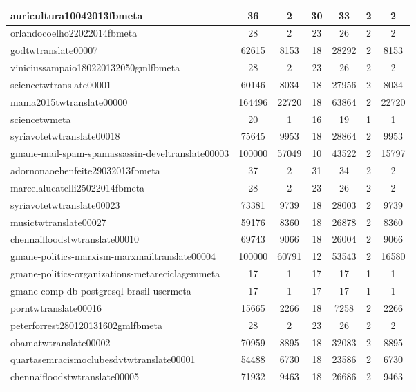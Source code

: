 \begin{table*}[h!]
\begin{center}
\begin{tabular}{| l | c | c | c | c | c | c |}
auricultura10042013fbmeta & 36  & 2  & 30  & 33  & 2  & 2 \\\hline
orlandocoelho22022014fbmeta & 28  & 2  & 23  & 26  & 2  & 2 \\\hline
godtwtranslate00007 & 62615  & 8153  & 18  & 28292  & 2  & 8153 \\\hline
viniciussampaio180220132050gmlfbmeta & 28  & 2  & 23  & 26  & 2  & 2 \\\hline
sciencetwtranslate00001 & 60146  & 8034  & 18  & 27956  & 2  & 8034 \\\hline
mama2015twtranslate00000 & 164496  & 22720  & 18  & 63864  & 2  & 22720 \\\hline
sciencetwmeta & 20  & 1  & 16  & 19  & 1  & 1 \\\hline
syriavotetwtranslate00018 & 75645  & 9953  & 18  & 28864  & 2  & 9953 \\\hline
gmane-mail-spam-spamassassin-develtranslate00003 & 100000  & 57049  & 10  & 43522  & 2  & 15797 \\\hline
adornonaoehenfeite29032013fbmeta & 37  & 2  & 31  & 34  & 2  & 2 \\\hline
marcelalucatelli25022014fbmeta & 28  & 2  & 23  & 26  & 2  & 2 \\\hline
syriavotetwtranslate00023 & 73381  & 9739  & 18  & 28003  & 2  & 9739 \\\hline
musictwtranslate00027 & 59176  & 8360  & 18  & 26878  & 2  & 8360 \\\hline
chennaifloodstwtranslate00010 & 69743  & 9066  & 18  & 26004  & 2  & 9066 \\\hline
gmane-politics-marxism-marxmailtranslate00004 & 100000  & 60791  & 12  & 53543  & 2  & 16580 \\\hline
gmane-politics-organizations-metareciclagemmeta & 17  & 1  & 17  & 17  & 1  & 1 \\\hline
gmane-comp-db-postgresql-brasil-usermeta & 17  & 1  & 17  & 17  & 1  & 1 \\\hline
porntwtranslate00016 & 15665  & 2266  & 18  & 7258  & 2  & 2266 \\\hline
peterforrest280120131602gmlfbmeta & 28  & 2  & 23  & 26  & 2  & 2 \\\hline
obamatwtranslate00002 & 70959  & 8895  & 18  & 32083  & 2  & 8895 \\\hline
quartasemracismoclubesdvtwtranslate00001 & 54488  & 6730  & 18  & 23586  & 2  & 6730 \\\hline
chennaifloodstwtranslate00005 & 71932  & 9463  & 18  & 26686  & 2  & 9463 \\\hline

\end{tabular}
\end{center}
\end{table*}
